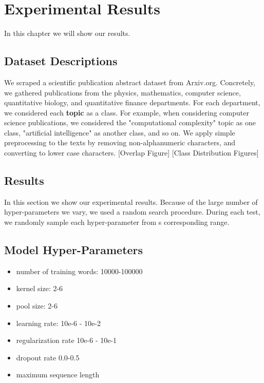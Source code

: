 
\chapter{Experimental Results} \label{Results}
In this chapter we will show our results.

\section{Dataset Descriptions}

We scraped a scientific publication abstract dataset from Arxiv.org. Concretely, we gathered
publications from the physics, mathematics, computer science, quantitative biology,
and quantitative finance departments. For each department, we considered each \textbf{topic} as a
class. For example, when considering computer science publications, we considered the
"computational complexity" topic as one class, "artificial intelligence" as another class,
and so on. We apply simple preprocessing to the texts by removing non-alphanumeric
characters, and converting to lower case characters. [Overlap Figure] [Class Distribution
Figures]

\section{Results}
In this section we show our experimental results. Because of the large number of hyper-parameters we vary, we
used a random search procedure. During each test, we randomly sample each hyper-parameter from s corresponding
range.
\section{Model Hyper-Parameters}
\begin{itemize}
  \item number of training words: 10000-100000
  \item kernel size: 2-6
  \item pool size: 2-6
  \item learning rate: 10e-6 - 10e-2
  \item regularization rate 10e-6 - 10e-1
  \item dropout rate 0.0-0.5
  \item maximum sequence length
\end{itemize}



%
%
